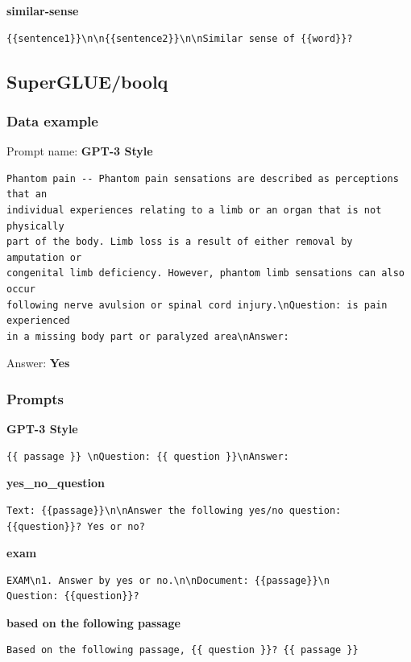 \documentclass[twoside,11pt]{article}
\begin{document}
\noindent\textbf{similar-sense}
\begin{verbatim}
{{sentence1}}\n\n{{sentence2}}\n\nSimilar sense of {{word}}?
\end{verbatim}

\subsection{SuperGLUE/boolq}

\subsubsection{Data example}

Prompt name: \textbf{GPT-3 Style}
\begin{verbatim}
Phantom pain -- Phantom pain sensations are described as perceptions that an 
individual experiences relating to a limb or an organ that is not physically 
part of the body. Limb loss is a result of either removal by amputation or 
congenital limb deficiency. However, phantom limb sensations can also occur 
following nerve avulsion or spinal cord injury.\nQuestion: is pain experienced 
in a missing body part or paralyzed area\nAnswer:
\end{verbatim}
Answer: \textbf{Yes}

\subsubsection{Prompts}

\textbf{GPT-3 Style}
\begin{verbatim}
{{ passage }} \nQuestion: {{ question }}\nAnswer:
\end{verbatim}

\noindent\textbf{yes\_no\_question}
\begin{verbatim}
Text: {{passage}}\n\nAnswer the following yes/no question:
{{question}}? Yes or no?
\end{verbatim}      

\noindent\textbf{exam}
\begin{verbatim}
EXAM\n1. Answer by yes or no.\n\nDocument: {{passage}}\n
Question: {{question}}?
\end{verbatim}

\noindent\textbf{based on the following passage}
\begin{verbatim}
Based on the following passage, {{ question }}? {{ passage }}
\end{verbatim}
\end{document}
